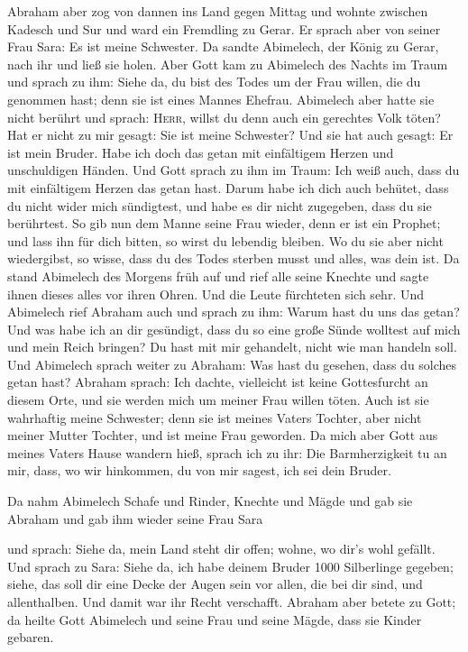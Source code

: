  Abraham aber zog von dannen ins Land gegen Mittag und
wohnte zwischen Kadesch und Sur und ward ein Fremdling zu Gerar.
 Er sprach aber von seiner Frau Sara: Es ist meine
Schwester. Da sandte Abimelech, der König zu Gerar, nach ihr und ließ
sie holen.  Aber Gott kam zu Abimelech des Nachts im Traum
und sprach zu ihm: Siehe da, du bist des Todes um der Frau willen, die
du genommen hast; denn sie ist eines Mannes Ehefrau. 
Abimelech aber hatte sie nicht berührt und sprach: \textsc{Herr}, willst
du denn auch ein gerechtes Volk töten?  Hat er nicht zu
mir gesagt: Sie ist meine Schwester? Und sie hat auch gesagt: Er ist
mein Bruder. Habe ich doch das getan mit einfältigem Herzen und
unschuldigen Händen.  Und Gott sprach zu ihm im Traum: Ich
weiß auch, dass du mit einfältigem Herzen das getan hast. Darum habe ich
dich auch behütet, dass du nicht wider mich sündigtest, und habe es dir
nicht zugegeben, dass du sie berührtest.  So gib nun dem
Manne seine Frau wieder, denn er ist ein Prophet; und lass ihn für dich
bitten, so wirst du lebendig bleiben. Wo du sie aber nicht wiedergibst,
so wisse, dass du des Todes sterben musst und alles, was dein ist.
 Da stand Abimelech des Morgens früh auf und rief alle
seine Knechte und sagte ihnen dieses alles vor ihren Ohren. Und die
Leute fürchteten sich sehr.  Und Abimelech rief Abraham
auch und sprach zu ihm: Warum hast du uns das getan? Und was habe ich an
dir gesündigt, dass du so eine große Sünde wolltest auf mich und mein
Reich bringen? Du hast mit mir gehandelt, nicht wie man handeln soll.
 Und Abimelech sprach weiter zu Abraham: Was hast du
gesehen, dass du solches getan hast?  Abraham sprach: Ich
dachte, vielleicht ist keine Gottesfurcht an diesem Orte, und sie werden
mich um meiner Frau willen töten.  Auch ist sie
wahrhaftig meine Schwester; denn sie ist meines Vaters Tochter, aber
nicht meiner Mutter Tochter, und ist meine Frau geworden.
 Da mich aber Gott aus meines Vaters Hause wandern hieß,
sprach ich zu ihr: Die Barmherzigkeit tu an mir, dass, wo wir hinkommen,
du von mir sagest, ich sei dein Bruder.

 Da nahm Abimelech Schafe und Rinder, Knechte und Mägde
und gab sie Abraham und gab ihm wieder seine Frau Sara

 und sprach: Siehe da, mein Land steht dir offen; wohne,
wo dir's wohl gefällt.  Und sprach zu Sara: Siehe da, ich
habe deinem Bruder 1000 Silberlinge gegeben; siehe, das soll dir eine
Decke der Augen sein vor allen, die bei dir sind, und allenthalben. Und
damit war ihr Recht verschafft.  Abraham aber betete zu
Gott; da heilte Gott Abimelech und seine Frau und seine Mägde, dass sie
Kinder gebaren.

